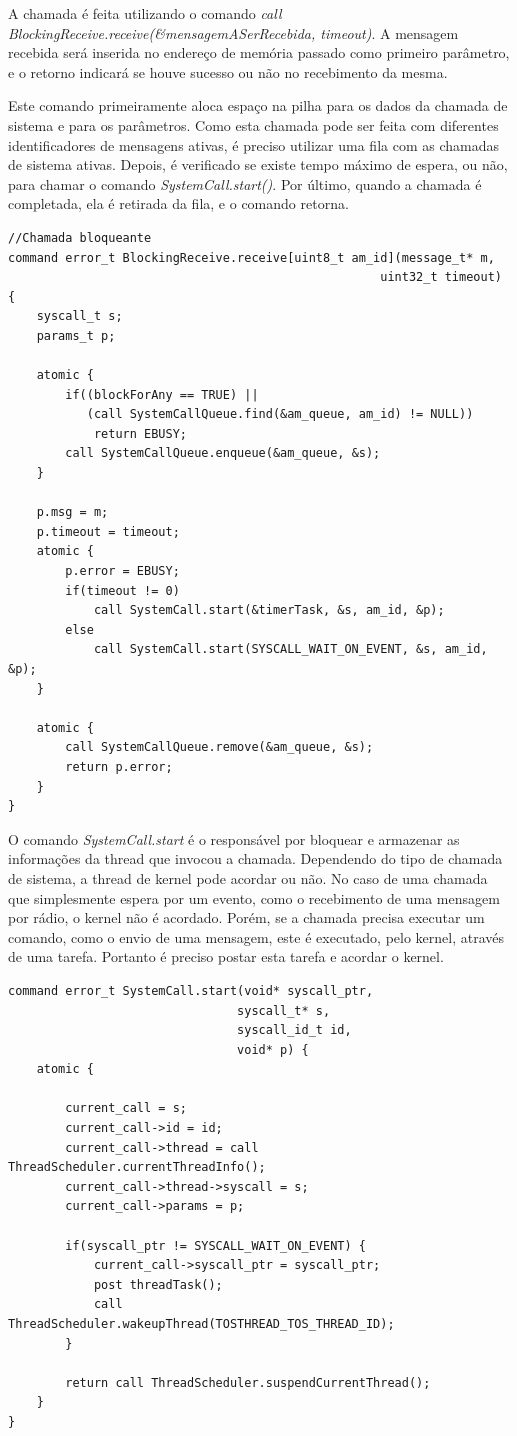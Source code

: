 A chamada é feita utilizando o comando \textit{call BlockingReceive.receive(\&mensagemASerRecebida, timeout)}. 
A mensagem recebida será inserida no endereço de memória passado como primeiro parâmetro, e o retorno indicará se houve
sucesso ou não no recebimento da mesma.

Este comando primeiramente aloca espaço na pilha para os dados da chamada de sistema e para os
parâmetros. Como esta chamada pode ser feita com diferentes identificadores de mensagens
ativas, é preciso utilizar uma fila com as chamadas de sistema ativas.
Depois, é verificado se existe tempo máximo de espera, ou não, para chamar o comando \textit{SystemCall.start()}.
Por último, quando a chamada é completada, ela é retirada da fila, e o comando retorna.
\begin{lstlisting}
//Chamada bloqueante
command error_t BlockingReceive.receive[uint8_t am_id](message_t* m,
                                                    uint32_t timeout) {
    syscall_t s;
    params_t p;

    atomic {
        if((blockForAny == TRUE) ||
           (call SystemCallQueue.find(&am_queue, am_id) != NULL))
            return EBUSY;
        call SystemCallQueue.enqueue(&am_queue, &s);
    }

    p.msg = m;
    p.timeout = timeout;
    atomic {
        p.error = EBUSY;
        if(timeout != 0)
            call SystemCall.start(&timerTask, &s, am_id, &p);
        else
            call SystemCall.start(SYSCALL_WAIT_ON_EVENT, &s, am_id, &p);
    }

    atomic {
        call SystemCallQueue.remove(&am_queue, &s);
        return p.error;
    }   
}
\end{lstlisting}

O comando \textit{SystemCall.start} é o responsável por bloquear e armazenar as informações da thread que invocou a
chamada.
Dependendo do tipo de chamada de sistema, a thread de kernel pode acordar ou não. No caso de uma chamada que
simplesmente espera por um evento, como o recebimento de uma mensagem por rádio, o kernel não é acordado.
Porém, se a chamada precisa executar um comando, como o envio de uma mensagem, este é executado, pelo kernel, através de uma
tarefa. Portanto é preciso postar esta tarefa e acordar o kernel.
\begin{lstlisting}
command error_t SystemCall.start(void* syscall_ptr,
                                syscall_t* s, 
                                syscall_id_t id, 
                                void* p) {
    atomic {

        current_call = s; 
        current_call->id = id;
        current_call->thread = call ThreadScheduler.currentThreadInfo();
        current_call->thread->syscall = s;
        current_call->params = p;

        if(syscall_ptr != SYSCALL_WAIT_ON_EVENT) {
            current_call->syscall_ptr = syscall_ptr;
            post threadTask();
            call ThreadScheduler.wakeupThread(TOSTHREAD_TOS_THREAD_ID);
        }

        return call ThreadScheduler.suspendCurrentThread();
    }
}
\end{lstlisting}

